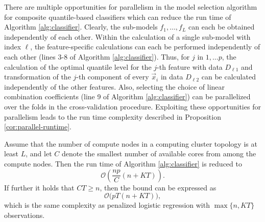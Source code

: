 There are multiple opportunities for parallelism in the model selection
algorithm for composite quantile-based classifiers which can reduce the run time
of Algorithm \ref{alg:classifier}.  Clearly, the sub-models $f_1, \dots, f_L$
can each be obtained independently of each other.  Within the calculation of a
single sub-model with index $\ell$, the feature-specific calculations can each
be performed independently of each other (lines 3-8 of Algorithm
\ref{alg:classifier}).  Thus, for $j$ in $1, \dots p$, the calculation of the
optimal quantile level for the $j$-th feature with data $D_{\ell 1}$ and
transformation of the $j$-th component of every $\vec{x}_i$ in data $D_{\ell 2}$
can be calculated independently of the other features.  Also, selecting the
choice of linear combination coefficients (line 9 of Algorithm
\ref{alg:classifier}) can be parallelized over the folds in the cross-validation
procedure.  Exploiting these opportunities for parallelism leads to the run time
complexity described in Proposition \ref{cor:parallel-runtime}.

\begin{proposition}
  \label{cor:parallel-runtime}
  Assume that the number of compute nodes in a computing cluster topology is at
  least $L$, and let $C$ denote the smallest number of available cores from
  among the compute nodes.  Then the run time of Algorithm \ref{alg:classifier}
  is reduced to
  \begin{equation}
    \label{eq:parallel-runtime-ass1}
    \mathcal{O}\left(
      \frac{np}{C} (n + KT)
    \right).
  \end{equation}
  If further it holds that $CT \geq n$, then the bound can be expressed as
  \begin{equation}
    \label{eq:parallel-runtime-ass2}
    \mathcal{O}\Big(  pT (n + KT) \Big),
  \end{equation}
  which is the same complexity as penalized logistic regression with
  $\max\{n, KT\}$ observations.
\end{proposition}

